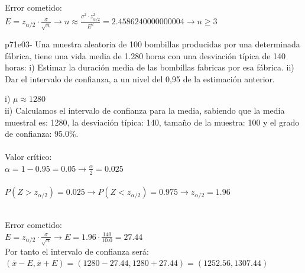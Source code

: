 \documentclass[spanish, 11pt]{exam}
\begin{document}
\begin{questions}
\begin{solution}
 \\
    Error cometido: \\ $E=z_{\alpha/2}\cdot \frac{\sigma}{\sqrt{n}} \to n \approx \frac{\sigma^2 \cdot z_{\alpha / 2}^2}{E^2}=2.4586240000000004 \to n \geq3$ \\    \end{solution}\question p71e03- Una muestra aleatoria de 100 bombillas producidas por una determinada fábrica, tiene una vida media de
1.280 horas con una desviación típica de 140 horas:
i) Estimar la duración media de las bombillas fabricas por esa fábrica.
ii) Dar el intervalo de confianza, a un nivel del 0,95 de la estimación anterior. \begin{solution}   i) $\mu\approx 1280$ \\ ii) Calculamos el intervalo de confianza para la media, sabiendo que la media muestral es: 1280, la desviación típica: 140, tamaño de la muestra: 100 y el grado de confianza: 95.0\%. \\ \\ Valor crítico: \\ $\alpha=1-0.95=0.05\to \frac{\alpha}{2}=0.025$ \\ \\ $P(Z>z_{\alpha/2})=0.025\to P(Z<z_{\alpha/2})=0.975 \to z_{\alpha/2} =1.96$ \\ 
     \\
    Error cometido: \\ $E=z_{\alpha/2}\cdot \frac{\sigma}{\sqrt{n}} \to E=1.96\cdot \frac{140}{10.0}=27.44$ \\ Por tanto el intervalo de confianza será: \\$\left(\overline{x} - E , \overline{x} + E \right)=\left(1280 - 27.44 , 1280 + 27.44 \right)=\left(1252.56, 1307.44 \right)$ \\  \\ 

\end{solution}
\end{questions}
\end{document}
